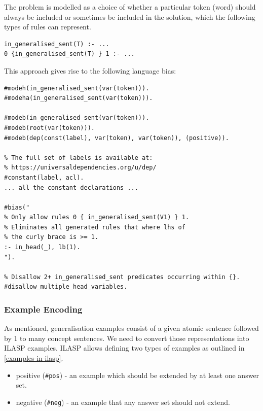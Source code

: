 The problem is modelled as a choice of whether a particular token (word) should always be included or sometimes be included in the solution, which the following types of rules can represent.
\begin{verbatim}
in_generalised_sent(T) :- ...
0 {in_generalised_sent(T) } 1 :- ...
\end{verbatim}

This approach gives rise to the following language bias:
\begin{verbatim}
#modeh(in_generalised_sent(var(token))).
#modeha(in_generalised_sent(var(token))).

#modeb(in_generalised_sent(var(token))).
#modeb(root(var(token))).
#modeb(dep(const(label), var(token), var(token)), (positive)).

% The full set of labels is available at:
% https://universaldependencies.org/u/dep/
#constant(label, acl).
... all the constant declarations ...

#bias("
% Only allow rules 0 { in_generalised_sent(V1) } 1.
% Eliminates all generated rules that where lhs of 
% the curly brace is >= 1.
:- in_head(_), lb(1).
").

% Disallow 2+ in_generalised_sent predicates occurring within {}.
#disallow_multiple_head_variables.

\end{verbatim}

\subsubsection{Example Encoding}
\label{example-encoding}

As mentioned, generalisation examples consist of a given atomic sentence followed by 1 to many concept sentences.
We need to convert those representations into ILASP examples.
ILASP allows defining two types of examples as outlined in \ref{examples-in-ilasp}.
\begin{itemize}
    \item positive (\verb_#pos_) - an example which should be extended by at least one answer set.
    \item negative (\verb_#neg_) - an example that any answer set should not extend.
\end{itemize}

